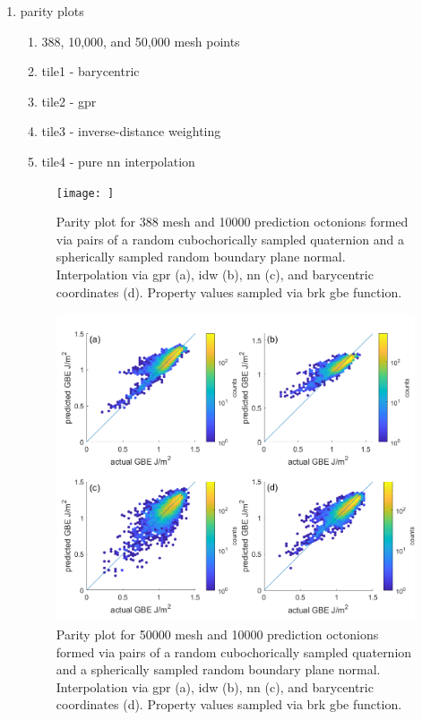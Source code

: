 \documentclass[preprint,12pt]{elsarticle}
\begin{document}
\begin{enumerate}
    \item parity plots
    \begin{enumerate}
        \item 388, 10,000, and 50,000 mesh points
        \item tile1 - barycentric
        \item tile2 - \gls{gpr}
        \item tile3 - inverse-distance weighting
        \item tile4 - pure \gls{nn} interpolation
    \end{enumerate}
    \begin{figure}
        \centering
        \texttt{[image: ]}
        \caption{Parity plot for 388 mesh and 10000 prediction octonions formed via pairs of a random cubochorically sampled quaternion and a spherically sampled random boundary plane normal. Interpolation via \acrlong{gpr} (a), \acrlong{idw} (b), \acrlong{nn} (c), and barycentric coordinates (d). Property values sampled via \acrlong{brk} \acrlong{gbe} function.}
        \label{fig:brk-parity388}
    \end{figure}
    \begin{figure}
        \centering
        \includegraphics{brkparity50000.png}
        \caption{Parity plot for 50000 mesh and 10000 prediction octonions formed via pairs of a random cubochorically sampled quaternion and a spherically sampled random boundary plane normal. Interpolation via \acrlong{gpr} (a), \acrlong{idw} (b), \acrlong{nn} (c), and barycentric coordinates (d). Property values sampled via \acrlong{brk} \acrlong{gbe} function.}

\end{figure}
\end{enumerate}
\end{document}
